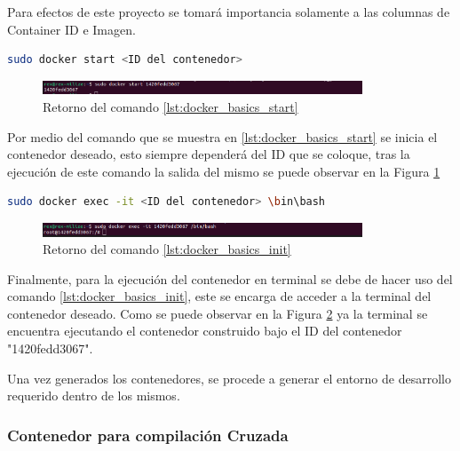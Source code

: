 Para efectos de este proyecto se tomará importancia solamente a las columnas de Container ID e Imagen.

\begin{lstlisting}[language=bash, caption={Iniciar un contenedor, Docker}, label=lst:docker_basics_start]
    sudo docker start <ID del contenedor>
\end{lstlisting}

\begin{figure}[h!]
    \centering
    \includegraphics[width=0.85\textwidth]{fig/especifico_2/retornos_de_comandos/sudo_docker_start.png}
    \caption{Retorno del comando \ref{lst:docker_basics_start}}
    \label{fig:sudo_docker_start}
\end{figure}

Por medio del comando que se muestra en \ref{lst:docker_basics_start} se inicia el contenedor deseado, esto siempre dependerá del ID que se coloque, tras la ejecución de este comando la salida del mismo se puede observar en la Figura \ref{fig:sudo_docker_start}

\begin{lstlisting}[language=bash, caption={Ingresar a un contenedor, Docker}, label=lst:docker_basics_init]
    sudo docker exec -it <ID del contenedor> \bin\bash
\end{lstlisting}

\begin{figure}[h!]
    \centering
    \includegraphics[width=0.85\textwidth]{fig/especifico_2/retornos_de_comandos/sudo_docker_init.png}
    \caption{Retorno del comando \ref{lst:docker_basics_init}}
    \label{fig:sudo_docker_init}
\end{figure}

Finalmente, para la ejecución del contenedor en terminal se debe de hacer uso del comando \ref{lst:docker_basics_init}, este se encarga de acceder a la terminal del contenedor deseado. Como se puede observar en la Figura \ref{fig:sudo_docker_init} ya la terminal se encuentra ejecutando el contenedor construido bajo el ID del contenedor "1420fedd3067".

Una vez generados los contenedores, se procede a generar el entorno de desarrollo requerido dentro de los mismos.

\subsubsection{Contenedor para compilación Cruzada}\label{subsec:generacion_entorno_xcompile}

